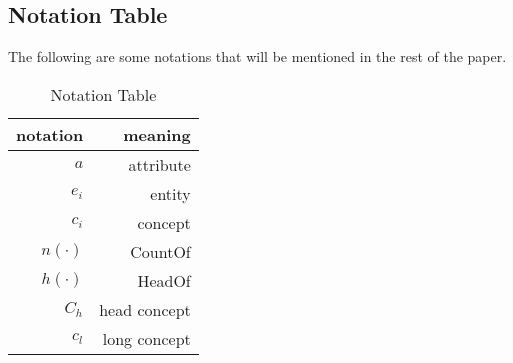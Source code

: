 \subsection{Notation Table}
The following are some notations that will be mentioned in the rest of the paper.
\begin{table}[htbp]
  \centering
  \caption{Notation Table}
    \begin{tabular}{rr}
    \toprule
    notation & meaning \\
    \midrule
    $a$     & attribute \\
    $e_i$  & entity \\
    $c_i$  & concept \\
    $n(\cdot)$  & CountOf \\
    $h(\cdot)$ & HeadOf \\
    $C_h$  & head concept \\
    $c_l$  & long concept \\
    \bottomrule
    \end{tabular}%
  \label{tab:notation}%
\end{table}%


%
%
%
%
%
%
%
%
%
%
%
%
%
